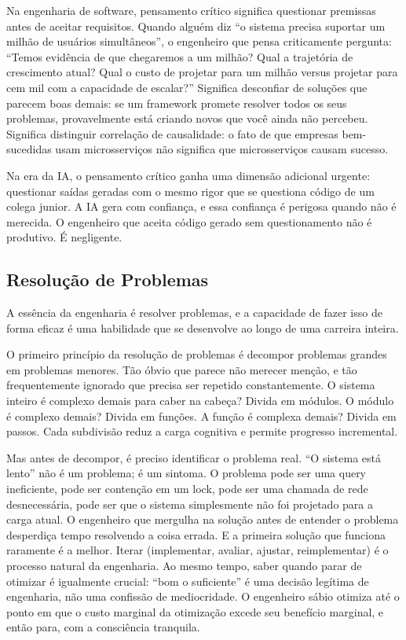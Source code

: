 Na engenharia de software, pensamento crítico significa questionar premissas antes de aceitar requisitos. Quando alguém diz ``o sistema precisa suportar um milhão de usuários simultâneos'', o engenheiro que pensa criticamente pergunta: ``Temos evidência de que chegaremos a um milhão? Qual a trajetória de crescimento atual? Qual o custo de projetar para um milhão versus projetar para cem mil com a capacidade de escalar?'' Significa desconfiar de soluções que parecem boas demais: se um framework promete resolver todos os seus problemas, provavelmente está criando novos que você ainda não percebeu. Significa distinguir correlação de causalidade: o fato de que empresas bem-sucedidas usam microsserviços não significa que microsserviços causam sucesso.

Na era da IA, o pensamento crítico ganha uma dimensão adicional urgente: questionar saídas geradas com o mesmo rigor que se questiona código de um colega junior. A IA gera com confiança, e essa confiança é perigosa quando não é merecida. O engenheiro que aceita código gerado sem questionamento não é produtivo. É negligente.

\subsection{Resolução de Problemas}

A essência da engenharia é resolver problemas, e a capacidade de fazer isso de forma eficaz é uma habilidade que se desenvolve ao longo de uma carreira inteira.

O primeiro princípio da resolução de problemas é decompor problemas grandes em problemas menores. Tão óbvio que parece não merecer menção, e tão frequentemente ignorado que precisa ser repetido constantemente. O sistema inteiro é complexo demais para caber na cabeça? Divida em módulos. O módulo é complexo demais? Divida em funções. A função é complexa demais? Divida em passos. Cada subdivisão reduz a carga cognitiva e permite progresso incremental.

Mas antes de decompor, é preciso identificar o problema real. ``O sistema está lento'' não é um problema; é um sintoma. O problema pode ser uma query ineficiente, pode ser contenção em um lock, pode ser uma chamada de rede desnecessária, pode ser que o sistema simplesmente não foi projetado para a carga atual. O engenheiro que mergulha na solução antes de entender o problema desperdiça tempo resolvendo a coisa errada. E a primeira solução que funciona raramente é a melhor. Iterar (implementar, avaliar, ajustar, reimplementar) é o processo natural da engenharia. Ao mesmo tempo, saber quando parar de otimizar é igualmente crucial: ``bom o suficiente'' é uma decisão legítima de engenharia, não uma confissão de mediocridade. O engenheiro sábio otimiza até o ponto em que o custo marginal da otimização excede seu benefício marginal, e então para, com a consciência tranquila.

